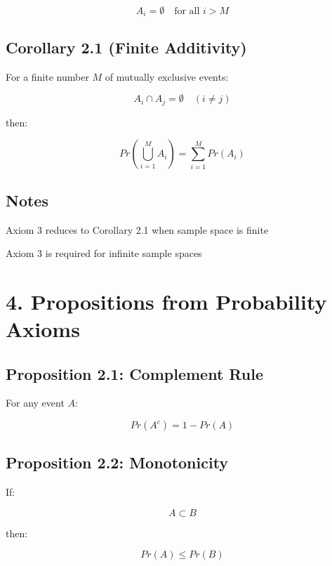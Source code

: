 \documentclass[12pt]{article}
\begin{document}
\[
A_i = \emptyset \quad \text{for all } i > M
\]

\subsection*{Corollary 2.1 (Finite Additivity)}

For a finite number $M$ of mutually exclusive events:

\[
A_i \cap A_j = \emptyset \quad (i \ne j)
\]

then:

\[
Pr\left(\bigcup_{i=1}^{M} A_i\right) = \sum_{i=1}^{M} Pr(A_i)
\]

\subsection*{Notes}

Axiom 3 reduces to Corollary 2.1 when sample space is finite

Axiom 3 is required for infinite sample spaces

\section*{4. Propositions from Probability Axioms}

\subsection*{Proposition 2.1: Complement Rule}

For any event $A$:

\[
Pr(A^c) = 1 - Pr(A)
\]

\subsection*{Proposition 2.2: Monotonicity}

If:

\[
A \subset B
\]

then:

\[
Pr(A) \le Pr(B)
\]
\end{document}
